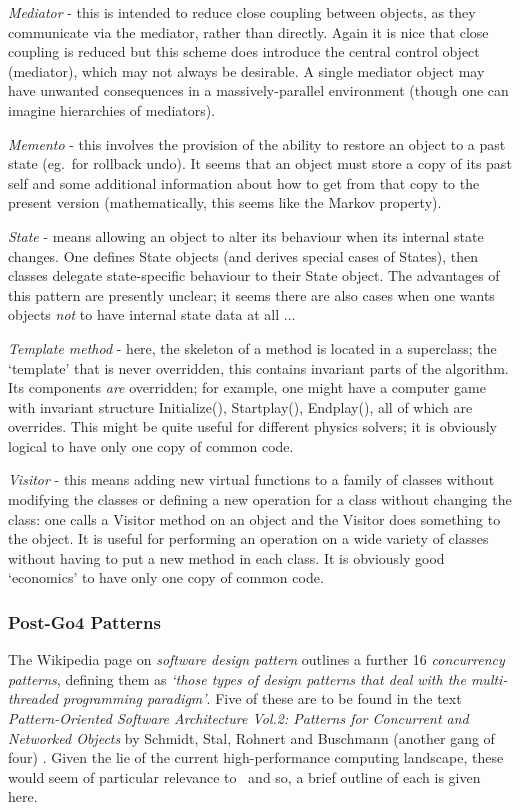 {\it Mediator} - this is intended to reduce close coupling between objects, as they communicate via the mediator, rather than directly.
Again it is nice that close coupling is reduced but this scheme does introduce the central control object (mediator), which may not always be desirable.
A single mediator object may have unwanted consequences in a massively-parallel environment (though one can imagine hierarchies of mediators).

{\it Memento} - this involves the provision of the ability to restore an object to a past state (eg.\ for rollback undo).
It seems that an object must store a copy of its past self and some additional information about how to get from that copy to the present version (mathematically, this seems like the Markov property).

{\it State} - means allowing an object to alter its behaviour when its internal state changes. 	One defines State objects (and derives special cases of States), then classes delegate state-specific behaviour to their State object.  The advantages of this pattern are presently unclear; it seems there are also cases when one wants objects {\it not} to have internal state data at all ...

{\it Template method} - here, the skeleton of a method is located in a superclass; the `template' that is never overridden, this contains invariant parts of the algorithm.
Its components {\it are} overridden; for example, one might have a computer game with invariant structure Initialize(), Startplay(), Endplay(), all of which are overrides.  This might be quite useful for different physics solvers; it is obviously logical to have only one copy of common code.

{\it Visitor} - this means adding new virtual functions to a family of classes without modifying the classes or defining a new operation for a class without changing the class: one calls a Visitor method on an object and the Visitor does something to the object.
It is useful for performing an operation on a wide variety of classes without having to put a new method in each class.
It is obviously good `economics' to have only one copy of common code.

\subsubsection{Post-Go4 Patterns}\label{sec:postgang4}

The Wikipedia page on {\it software design pattern} \cite{softwarepatternwiki} outlines a further 16 {\it concurrency patterns}, defining them as {\it`those types of design patterns that deal with the multi-threaded programming paradigm'}.  
Five of these are to be found in the text {\it Pattern-Oriented Software Architecture Vol.2: Patterns for Concurrent and Networked Objects} by Schmidt, Stal, Rohnert and Buschmann (another gang of four) \cite{schmidtstalrohnertbuschmann}.  
Given the lie of the current high-performance computing landscape, these would seem of particular relevance to \nep \  and so, a brief outline of each is given here.

